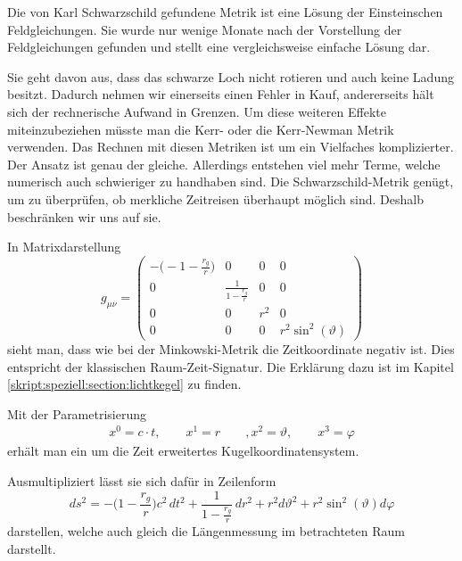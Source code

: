 \begin{refsection}
	Die von Karl Schwarzschild gefundene Metrik ist eine Lösung der Einsteinschen Feldgleichungen. Sie wurde nur wenige Monate nach der Vorstellung der Feldgleichungen gefunden und stellt eine vergleichsweise einfache Lösung dar. 
    
    Sie geht davon aus, dass das schwarze Loch nicht rotieren und auch keine Ladung besitzt. Dadurch nehmen wir einerseits einen Fehler in Kauf, andererseits hält sich der rechnerische Aufwand in Grenzen. Um diese weiteren Effekte miteinzubeziehen müsste man die Kerr- oder die Kerr-Newman Metrik verwenden. Das Rechnen mit diesen Metriken ist um ein Vielfaches komplizierter. Der Ansatz ist genau der gleiche. Allerdings entstehen viel mehr Terme, welche numerisch auch schwieriger zu handhaben sind. Die Schwarzschild-Metrik genügt, um zu überprüfen, ob merkliche Zeitreisen überhaupt möglich sind. Deshalb beschränken wir uns auf sie.
    
	In Matrixdarstellung
	\begin{equation}\label{equation:schwarzschild}
	g_{\mu\nu}=
	\begin{pmatrix}
	-\biggl(-1- \displaystyle \frac{r_{g}}{r}\biggr) & 0 & 0 & 0 \\
	0 & \frac{\displaystyle 1}{\displaystyle1-\frac{r_{g}}{r}} & 0 & 0 \\
	0 & 0 & r^{2} & 0 \\
	0 & 0 & 0 & r^{2}\sin^{2}(\vartheta)
	\end{pmatrix}
	\end{equation}
	sieht man, dass wie bei der Minkowski-Metrik die Zeitkoordinate negativ ist. Dies entspricht der klassischen Raum-Zeit-Signatur. Die Erklärung dazu ist im Kapitel \ref{skript:speziell:section:lichtkegel} zu finden.
    
	Mit der Parametrisierung
	\begin{align*}
	x^{0}=c \cdot t, \qquad
	x^{1}=r \qquad,
	x^{2}=\vartheta, \qquad
	x^{3}=\varphi
	\end{align*}
    erhält man ein um die Zeit erweitertes Kugelkoordinatensystem.
    
	Ausmultipliziert lässt sie sich dafür in Zeilenform
	\begin{equation}
	ds^2
	=
	-\biggl(1-\frac{r_g}r\biggr)c^2\,dt^2
	+
	\frac{1}{\displaystyle 1-\frac{r_g}r}\,dr^2 
	+
	r^2d\vartheta^2 
	+ 
	r^2\sin^2(\vartheta)d\varphi
	\end{equation}
	darstellen, welche auch gleich die Längenmessung im betrachteten Raum darstellt.
	

\end{refsection}
